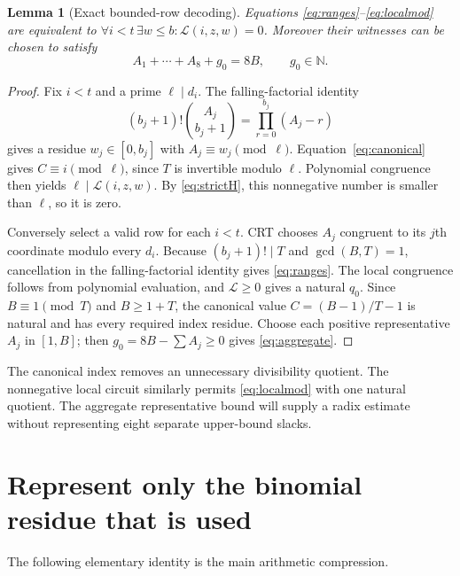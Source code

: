 \documentclass[10pt,letterpaper]{article}
\newtheorem{lemma}[theorem]{Lemma}
\theoremstyle{definition}\newtheorem{definition}[theorem]{Definition}
\theoremstyle{remark}\newtheorem{remark}[theorem]{Remark}
\newcommand{\N}{\mathbb N}\newcommand{\Z}{\mathbb Z}\newcommand{\Q}{\mathbb Q}
\begin{document}
\begin{lemma}[Exact bounded-row decoding]\label{lem:CRT}
Equations \eqref{eq:ranges}--\eqref{eq:localmod} are equivalent to
$\forall i<t\,\exists w\le b:\mathcal L(i,z,w)=0$.
Moreover their witnesses can be chosen to satisfy
\begin{equation}\label{eq:aggregate}
 A_1+\cdots+A_8+g_0=8B,\qquad g_0\in\N.
\end{equation}
\end{lemma}
\begin{proof}
Fix $i<t$ and a prime $\ell\mid d_i$. The falling-factorial identity
\[
 (b_j+1)!\binom{A_j}{b_j+1}=\prod_{r=0}^{b_j}(A_j-r)
\]
gives a residue $w_j\in[0,b_j]$ with $A_j\equiv w_j\pmod\ell$.
Equation~\eqref{eq:canonical} gives $C\equiv i\pmod\ell$, since $T$
is invertible modulo $\ell$. Polynomial congruence then yields
$\ell\mid\mathcal L(i,z,w)$. By \eqref{eq:strictH}, this nonnegative
number is smaller than $\ell$, so it is zero.

Conversely select a valid row for each $i<t$. CRT chooses $A_j$
congruent to its $j$th coordinate modulo every $d_i$. Because
$(b_j+1)!\mid T$ and $\gcd(B,T)=1$, cancellation in the falling-factorial
identity gives \eqref{eq:ranges}. The local congruence follows from
polynomial evaluation, and $\mathcal L\ge0$ gives a natural $q_0$.
Since $B\equiv1\pmod T$ and $B\ge1+T$, the canonical value
$C=(B-1)/T-1$ is natural and has every required index residue.
Choose each positive representative $A_j$ in $[1,B]$; then
$g_0=8B-\sum A_j\ge0$ gives \eqref{eq:aggregate}.
\end{proof}

The canonical index removes an unnecessary divisibility quotient. The
nonnegative local circuit similarly permits \eqref{eq:localmod} with
one natural quotient. The aggregate representative bound will supply a
radix estimate without representing eight separate upper-bound slacks.

\section{Represent only the binomial residue that is used}
\label{sec:radix}

The following elementary identity is the main arithmetic compression.
\end{document}
